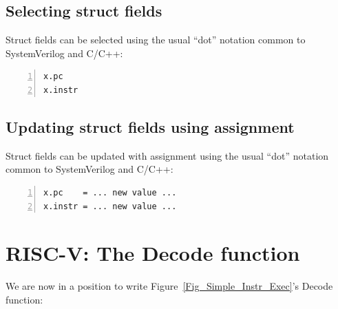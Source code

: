 \subsection{Selecting struct fields}


Struct fields can be selected using the usual ``dot'' notation common
to SystemVerilog and C/C++:

\begin{Verbatim}[frame=single, numbers=left]
x.pc
x.instr
\end{Verbatim}



\subsection{Updating struct fields using assignment}


Struct fields can be updated with assignment using the usual ``dot''
notation common to SystemVerilog and C/C++:

\begin{Verbatim}[frame=single, numbers=left]
x.pc    = ... new value ...
x.instr = ... new value ...
\end{Verbatim}


\section{RISC-V: The Decode function}

\label{Sec_Combo_Decode}


We are now in a position to write Figure~\ref{Fig_Simple_Instr_Exec}'s Decode function:

